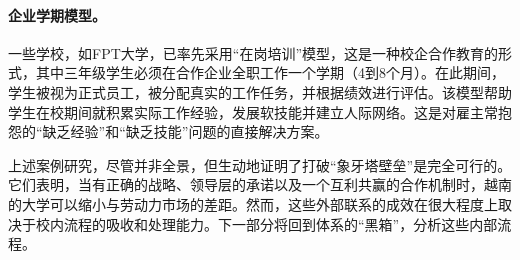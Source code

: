 \paragraph{企业学期模型。} 一些学校，如FPT大学，已率先采用“在岗培训”模型，这是一种校企合作教育的形式，其中三年级学生必须在合作企业全职工作一个学期（4到8个月）。在此期间，学生被视为正式员工，被分配真实的工作任务，并根据绩效进行评估。该模型帮助学生在校期间就积累实际工作经验，发展软技能并建立人际网络。这是对雇主常抱怨的“缺乏经验”和“缺乏技能”问题的直接解决方案。

\bigskip
上述案例研究，尽管并非全景，但生动地证明了打破“象牙塔壁垒”是完全可行的。它们表明，当有正确的战略、领导层的承诺以及一个互利共赢的合作机制时，越南的大学可以缩小与劳动力市场的差距。然而，这些外部联系的成效在很大程度上取决于校内流程的吸收和处理能力。下一部分将回到体系的“黑箱”，分析这些内部流程。
















